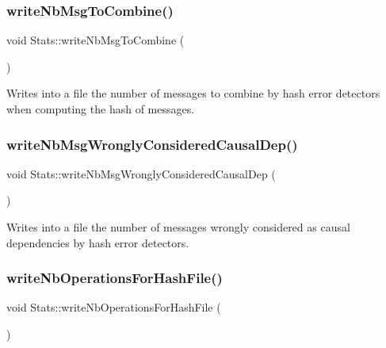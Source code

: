 \subsubsection{\texorpdfstring{write\+Nb\+Msg\+To\+Combine()}{writeNbMsgToCombine()}}
{\footnotesize\ttfamily void Stats\+::write\+Nb\+Msg\+To\+Combine (\begin{DoxyParamCaption}{ }\end{DoxyParamCaption})\hspace{0.3cm}{\ttfamily [private]}}



Writes into a file the number of messages to combine by hash error detectors when computing the hash of messages. 

\mbox{\label{class_stats_a04ae8a18f5e0713f9275a3cf7b20d181}} 
\subsubsection{\texorpdfstring{write\+Nb\+Msg\+Wrongly\+Considered\+Causal\+Dep()}{writeNbMsgWronglyConsideredCausalDep()}}
{\footnotesize\ttfamily void Stats\+::write\+Nb\+Msg\+Wrongly\+Considered\+Causal\+Dep (\begin{DoxyParamCaption}{ }\end{DoxyParamCaption})\hspace{0.3cm}{\ttfamily [private]}}



Writes into a file the number of messages wrongly considered as causal dependencies by hash error detectors. 

\mbox{\label{class_stats_af07c3564deda3a19d1efe92108a20c19}} 
\subsubsection{\texorpdfstring{write\+Nb\+Operations\+For\+Hash\+File()}{writeNbOperationsForHashFile()}}
{\footnotesize\ttfamily void Stats\+::write\+Nb\+Operations\+For\+Hash\+File (\begin{DoxyParamCaption}{ }\end{DoxyParamCaption})\hspace{0.3cm}{\ttfamily [private]}}



